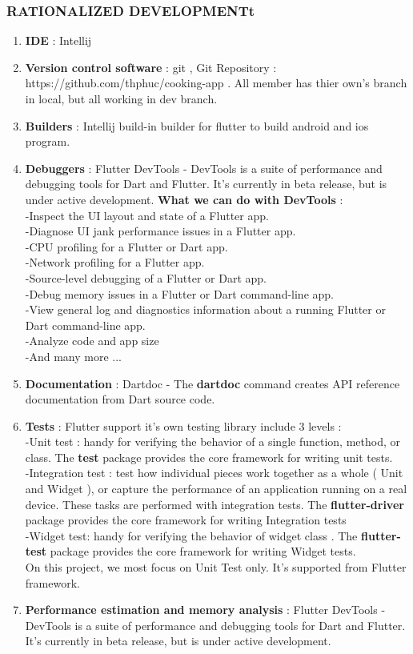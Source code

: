 \documentclass{article}
\begin{document}
\subsubsection{RATIONALIZED DEVELOPMENTt}
\begin{enumerate}
\item \textbf{IDE} : Intellij 
\item \textbf{Version control software}  : git , Git Repository : https://github.com/thphuc/cooking-app  . All member has thier own's branch in local, but all working in dev branch.
\item \textbf{Builders} : Intellij build-in builder for flutter to build android and ios program.
\item \textbf{Debuggers} : Flutter DevTools - DevTools is a suite of performance and debugging tools for Dart and Flutter. It’s currently in beta release, but is under active development.\textbf{ What we can do with DevTools } : \\
-Inspect the UI layout and state of a Flutter app. \\
-Diagnose UI jank performance issues in a Flutter app. \\
-CPU profiling for a Flutter or Dart app. \\
-Network profiling for a Flutter app. \\
-Source-level debugging of a Flutter or Dart app. \\
-Debug memory issues in a Flutter or Dart command-line app. \\
-View general log and diagnostics information about a running Flutter or Dart command-line app. \\
-Analyze code and app size \\
-And many more ... \\
\item \textbf{Documentation} : Dartdoc - The \textbf{dartdoc} command creates API reference documentation from Dart source code.
\item \textbf{Tests} : Flutter support it's own testing library include 3 levels :  \\
-Unit test :  handy for verifying the behavior of a single function, method, or class. The \textbf{test} package provides the core framework for writing unit tests. \\
-Integration test : test how individual pieces work together as a whole ( Unit and Widget ), or capture the performance of an application running on a real device. These tasks are performed with integration tests.  The \textbf{flutter-driver} package provides the core framework for writing Integration tests \\
 -Widget test: handy for verifying the behavior of widget class . The \textbf{flutter-test} package provides the core framework for writing Widget tests. \\
On this project, we most focus on Unit Test only. It's supported from Flutter framework.
\item \textbf{Performance estimation and memory analysis} : Flutter DevTools - DevTools is a suite of performance and debugging tools for Dart and Flutter. It’s currently in beta release, but is under active development.
\end{enumerate}
\end{document}
